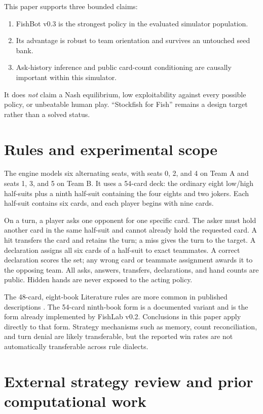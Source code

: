 \documentclass[11pt]{article}
\begin{document}
This paper supports three bounded claims:

\begin{enumerate}
  \item FishBot v0.3 is the strongest policy in the evaluated simulator population.
  \item Its advantage is robust to team orientation and survives an untouched seed bank.
  \item Ask-history inference and public card-count conditioning are causally important within this simulator.
\end{enumerate}

It does \emph{not} claim a Nash equilibrium, low exploitability against every possible policy, or unbeatable human play. ``Stockfish for Fish'' remains a design target rather than a solved status.

\section{Rules and experimental scope}

The engine models six alternating seats, with seats 0, 2, and 4 on Team A and seats 1, 3, and 5 on Team B. It uses a 54-card deck: the ordinary eight low/high half-suits plus a ninth half-suit containing the four eights and two jokers. Each half-suit contains six cards, and each player begins with nine cards.

On a turn, a player asks one opponent for one specific card. The asker must hold another card in the same half-suit and cannot already hold the requested card. A hit transfers the card and retains the turn; a miss gives the turn to the target. A declaration assigns all six cards of a half-suit to exact teammates. A correct declaration scores the set; any wrong card or teammate assignment awards it to the opposing team. All asks, answers, transfers, declarations, and hand counts are public. Hidden hands are never exposed to the acting policy.

The 48-card, eight-book Literature rules are more common in published descriptions \cite{pagat,develin}. The 54-card ninth-book form is a documented variant \cite{pagat} and is the form already implemented by FishLab v0.2. Conclusions in this paper apply directly to that form. Strategy mechanisms such as memory, count reconciliation, and turn denial are likely transferable, but the reported win rates are not automatically transferable across rule dialects.

\section{External strategy review and prior computational work}
\end{document}
